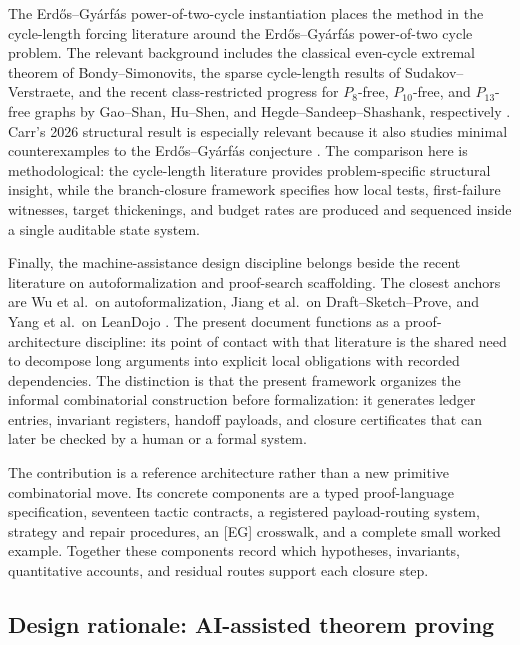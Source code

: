 \documentclass[
  11pt,
]{article}
\theoremstyle{definition}
\begin{document}
The Erdős--Gyárfás power-of-two-cycle instantiation places the method in
the cycle-length forcing literature around the Erdős--Gyárfás
power-of-two cycle problem. The
relevant background includes the classical even-cycle extremal theorem
of Bondy--Simonovits, the sparse cycle-length results of
Sudakov--Verstraete, and the recent class-restricted progress for
\(P_8\)-free, \(P_{10}\)-free, and \(P_{13}\)-free graphs by Gao--Shan,
Hu--Shen, and Hegde--Sandeep--Shashank, respectively
\citep{bondy-simonovits-1974-even-cycles, sudakov-verstraete-2008-cycle-lengths, gao-shan-2021-p8, hu-shen-2023-p10, hegde-etal-2024-p13}.
Carr's 2026 structural result is especially relevant because it also
studies minimal counterexamples to the Erdős--Gyárfás conjecture
\citep{carr-2026-minimal-counterexample}. The
comparison here is methodological: the cycle-length literature provides
problem-specific structural insight, while the branch-closure framework
specifies how local tests, first-failure witnesses, target thickenings,
and budget rates are produced and sequenced inside a single auditable
state system.

Finally, the machine-assistance design discipline belongs beside the
recent literature on autoformalization and proof-search scaffolding. The
closest anchors are Wu et al.~on autoformalization, Jiang et al.~on
Draft--Sketch--Prove, and Yang et al.~on LeanDojo
\citep{wu-etal-2022-autoformalization, jiang-etal-2022-draft-sketch-prove, yang-etal-2023-leandojo}.
The present document functions as a proof-architecture discipline: its
point of contact with that literature is the shared need to decompose
long arguments into explicit local obligations with recorded
dependencies. The distinction is that the present framework organizes
the informal combinatorial construction before formalization: it
generates ledger entries, invariant registers, handoff payloads, and
closure certificates that can later be checked by a human or a formal
system.

The contribution is a reference architecture rather than a new primitive
combinatorial move. Its concrete components are a typed proof-language
specification, seventeen tactic contracts, a registered payload-routing
system, strategy and repair procedures, an [EG] crosswalk, and a complete
small worked example. Together these components record which hypotheses,
invariants, quantitative accounts, and residual routes support each
closure step.

\subsection{Design rationale: AI-assisted theorem
proving}\label{design-rationale-scaffolding-for-llm-assisted-proof-development}
\end{document}
